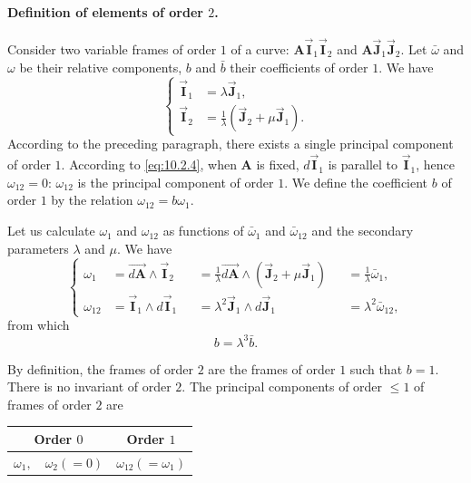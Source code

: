 \documentclass[leqno,11pt]{book}
\numberwithin{equation}{chapter}
\theoremstyle{shape1}
\theoremstyle{shapesmall}
\newcommand{\rvec}[1]{\vec{\mathbf{#1}}}
\newcommand{\ivec}{\rvec{I}}
\newcommand{\jvec}{\rvec{J}}
\begin{document}
\paragraph{Definition of elements of order $2$.}
\label{sec:135}
Consider two variable frames of order $1$ of a curve: $\mathbf{A}\ivec_{1}\ivec_{2}$ and $\mathbf{A}\jvec_{1}\jvec_{2}$. Let $\bar\omega$ and $\omega$ be their relative components, $b$ and $\bar b$ their coefficients of order $1$. We have
\begin{equation}
  \label{eq:10.2.4}
  \left\{
    \begin{aligned}
      \ivec_{1}&=\lambda\jvec_{1},\\
      \ivec_{2}&=\frac{1}{\lambda}(\jvec_{2}+\mu\jvec_{1}).
    \end{aligned}
  \right.
\end{equation}
According to the preceding paragraph, there exists a single principal component of order $1$. According to \eqref{eq:10.2.4}, when $\mathbf{A}$ is fixed, $d\ivec_{1}$ is parallel to $\ivec_{1}$, hence $\omega_{12}=0$: $\omega_{12}$ is the principal component of order $1$. We define the coefficient $b$ of order $1$ by the relation $\omega_{12}=b\omega_{1}$.

Let us calculate $\omega_{1}$ and $\omega_{12}$ as functions of $\bar\omega_{1}$ and $\bar\omega_{12}$ and the secondary parameters $\lambda$ and $\mu$. We have
\begin{equation}
  \label{eq:10.2.5}
  \left\{
    \begin{alignedat}{20}
      \omega_{1}&=\overrightarrow{d\mathbf{A}}\wedge\ivec_{2}&&=\frac{1}{\lambda}\overrightarrow{d\mathbf{A}}\wedge(\jvec_{2}+\mu\jvec_{1})&&=\frac{1}{\lambda}\bar\omega_{1},\\
      \omega_{12}&=\ivec_{1}\wedge d\ivec_{1}&&=\lambda^{2}\jvec_{1}\wedge d\jvec_{1}&&=\lambda^{2}\bar\omega_{12},
    \end{alignedat}
  \right.
\end{equation}
from which
\begin{equation}
  \label{eq:10.2.6}
  b=\lambda^{3}\bar b.
\end{equation}

By definition, the frames of order $2$ are the frames of order $1$ such that $b=1$. There is no invariant of order $2$. The principal components of order $\le 1$ of frames of order $2$ are
\begin{center}  
\begin{tabular}{|c|c|}
  \hline
  Order $0$&Order $1$\\
  \hline
  $\omega_{1},\quad\omega_{2}(=0)$&$\omega_{12}(=\omega_{1})$\\
  \hline
\end{tabular}
\end{center}
\end{document}
